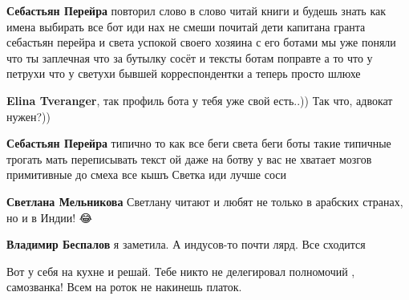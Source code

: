 \begin{itemize}
\begin{itemize}
\textbf{Себастьян Перейра} повторил слово в слово читай книги и будешь знать как имена выбирать все бот иди нах не смеши почитай дети капитана гранта себастьян перейра и света успокой своего хозяина с его ботами мы уже поняли что ты заплечная что за бутылку сосёт и тексты ботам поправте а то что у петрухи что у светухи бывшей корреспондентки а теперь просто шлюхе

 
\textbf{Elina Tveranger}, так профиль бота у тебя уже свой есть..)) Так что, адвокат нужен?))

 
\textbf{Себастьян Перейра} типично то как все беги света беги боты такие типичные трогать мать переписывать текст ой даже на ботву у вас не хватает мозгов примитивные до смеха все кышъ Светка иди лучше соси

 
\textbf{Светлана Мельникова} Светлану читают и любят не только в арабских странах, но и в Индии! 😂

 
\textbf{Владимир Беспалов} я заметила. А индусов-то почти лярд. Все сходится

 
Вот у себя на кухне и решай. Тебе никто не делегировал полномочий , самозванка! Всем на роток не накинешь платок.

 

\end{itemize}
\end{itemize}
